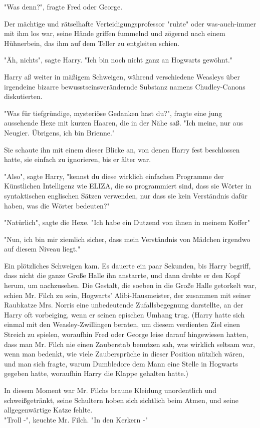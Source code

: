 {"Was denn?", fragte Fred oder George.

Der mächtige und rätselhafte Verteidigungsprofessor "ruhte" oder was-auch-immer mit ihm los war, seine Hände griffen fummelnd und zögernd nach einem Hühnerbein, das ihm auf dem Teller zu entgleiten schien.

"Äh, nichts", sagte Harry. "Ich bin noch nicht ganz an Hogwarts gewöhnt."

Harry aß weiter in mäßigem Schweigen, während verschiedene Weasleys über irgendeine bizarre bewusstseinsverändernde Substanz namens Chudley-Canons diskutierten.

"Was für tiefgründige, mysteriöse Gedanken hast du?", fragte eine jung aussehende Hexe mit kurzen Haaren, die in der Nähe saß. "Ich meine, nur aus Neugier. Übrigens, ich bin Brienne."

Sie schaute ihn mit einem dieser Blicke an, von denen Harry fest beschlossen hatte, sie einfach zu ignorieren, bis er älter war.

"Also", sagte Harry, "kennst du diese wirklich einfachen Programme der Künstlichen Intelligenz wie ELIZA, die so programmiert sind, dass sie Wörter in syntaktischen englischen Sätzen verwenden, nur dass sie kein Verständnis dafür haben, was die Wörter bedeuten?"

"Natürlich", sagte die Hexe. "Ich habe ein Dutzend von ihnen in meinem Koffer"

"Nun, ich bin mir ziemlich sicher, dass mein Verständnis von Mädchen irgendwo auf diesem Niveau liegt."

Ein plötzliches Schweigen kam. Es dauerte ein paar Sekunden, bis Harry begriff, dass nicht die ganze Große Halle ihn anstarrte, und dann drehte er den Kopf herum, um nachzusehen. Die Gestalt, die soeben in die Große Halle getorkelt war, schien Mr. Filch zu sein, Hogwarts' Alibi-Hausmeister, der zusammen mit seiner Raubkatze Mrs. Norris eine unbedeutende Zufallsbegegnung darstellte, an der Harry oft vorbeiging, wenn er seinen epischen Umhang trug. (Harry hatte sich einmal mit den Weasley-Zwillingen beraten, um diesem verdienten Ziel einen Streich zu spielen, woraufhin Fred oder George leise darauf hingewiesen hatten, dass man Mr. Filch nie einen Zauberstab benutzen sah, was wirklich seltsam war, wenn man bedenkt, wie viele Zaubersprüche in dieser Position nützlich wären, und man sich fragte, warum Dumbledore dem Mann eine Stelle in Hogwarts gegeben hatte, woraufhin Harry die Klappe gehalten hatte.)

In diesem Moment war Mr. Filchs braune Kleidung unordentlich und schweißgetränkt, seine Schultern hoben sich sichtlich beim Atmen, und seine allgegenwärtige Katze fehlte.\\ "Troll -", keuchte Mr. Filch. "In den Kerkern -"

}
